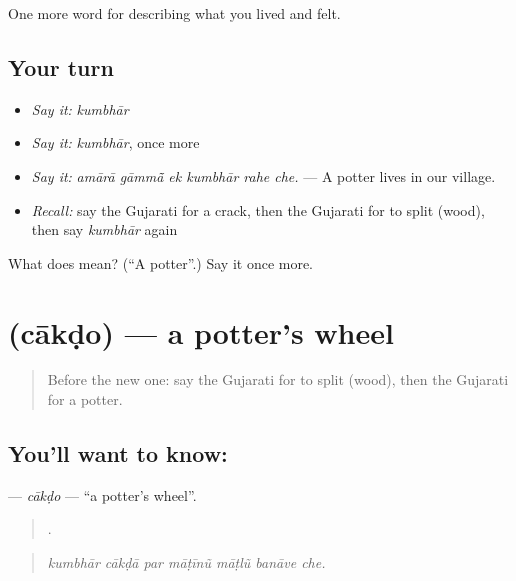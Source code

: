 \begin{grammarlens}[title={What you've built}]
One more word for describing what you lived and felt.
\end{grammarlens}

\subsection*{Your turn}
\begin{itemize}
\raggedright
  \item \emph{Say it:} \emph{kumbhār}
  \item \emph{Say it:} \emph{kumbhār}, once more
  \item \emph{Say it:} \emph{amārā gāmmā̃ ek kumbhār rahe che.} — A potter lives in our village.
  \item \emph{Recall:} say the Gujarati for a crack, then the Gujarati for to split (wood), then say \emph{kumbhār} again
\end{itemize}

\begin{tcolorbox}[breakable,colback=teal!4,colframe=teal!35!black,title={Before you move on}]
What does  mean? (\textquotedblleft{}A potter\textquotedblright{}.) Say it once more.
\end{tcolorbox}
\section[\texorpdfstring{\gu{ચાકડો} (cākḍo)}{ચાકડો (cākḍo)}]{ (cākḍo) — a potter's wheel}

\label{lesson:GU-C504-cakdo}



\begin{quote}
Before the new one: say the Gujarati for to split (wood), then the Gujarati for a potter.
\end{quote}

\subsection*{You'll want to know: }
\textbf{} — \emph{cākḍo} — \textquotedblleft{}a potter's wheel\textquotedblright{}.

\begin{quote}
      .
\end{quote}

\begin{quote}
\emph{kumbhār cākḍā par māṭīnũ māṭlũ banāve che.}
\end{quote}

